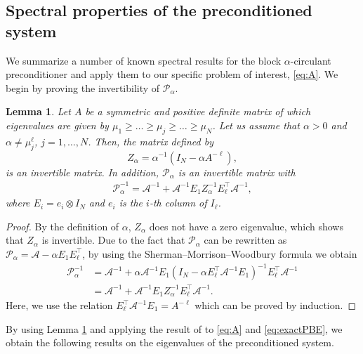 \documentclass{article}
\newtheorem{lem}{Lemma}
\newcommand{\sizeA}{N}
\theoremstyle{definition}
\begin{document}
	
	
	
	\subsection{Spectral properties of the preconditioned system}\label{sec:EvalsofPrecondSys}
	
	We summarize a number of known spectral results for the block $\alpha$-circulant preconditioner 
	and apply them to our specific problem of interest, \eqref{eq:A}. We begin by proving the invertibility of $\mathcal{P}_{\alpha}$.
	\begin{lem}
		\label{lemma:Zalpha}
		Let $A$ be a symmetric and positive definite matrix of which eigenvalues are given by $\mu_1 \ge \ldots \ge \mu_j \ge \ldots \ge \mu_\sizeA$. Let us assume that $\alpha > 0$ and $\alpha \ne \mu_j^\ell$, $j = 1,\dots,\sizeA$. Then, the matrix defined by 
		$$
		Z_\alpha = \alpha^{-1}(I_\sizeA-\alpha A^{-\ell}),
		$$
		is an invertible matrix. In addition, $\mathcal{P}_{\alpha}$ is an invertible matrix with 
		\begin{align*}
			\mathcal{P}_\alpha^{-1} = \mathcal{A}^{-1} + \mathcal{A}^{-1}E_1Z_\alpha^{-1}E_\ell^{\top}\mathcal{A}^{-1},
		\end{align*}
		where $E_i = e_i\otimes I_N$ and $e_i$ is the $i$-th column of $I_{\ell}$.
	\end{lem}
	\begin{proof}
		By the definition of $\alpha$, $Z_{\alpha}$ does not have a zero eigenvalue, which shows that $Z_{\alpha}$ is invertible. 
		Due to the fact that $\mathcal{P}_\alpha$ can be rewritten as $ \mathcal{P}_\alpha = \mathcal{A}- \alpha E_1 E_\ell^{\top}$, 
		by using the Sherman--Morrison--Woodbury formula we obtain
		\begin{align*}
			\mathcal{P}_\alpha^{-1} & =  \mathcal{A}^{-1} + \alpha\mathcal{A}^{-1}E_1(I_\sizeA - \alpha E_\ell^{\top}\mathcal{A}^{-1}E_1)^{-1}E_\ell^{\top}\mathcal{A}^{-1} \\
			& =  \mathcal{A}^{-1} + \mathcal{A}^{-1}E_1Z_\alpha^{-1}E_\ell^{\top}\mathcal{A}^{-1}.
		\end{align*}
		{Here, we use the relation $ E_\ell^{\top}\mathcal{A}^{-1}E_1 = A^{-\ell}$ which can be proved by induction.}
	\end{proof}
	
	
	
	By using Lemma \ref{lemma:Zalpha} and applying the result of  \cite[Theorem 3.2]{LinNgalphacirculant2021} to \eqref{eq:A} and \eqref{eq:exactPBE}, we obtain the following results on the eigenvalues of the preconditioned system.
	
\end{document}

